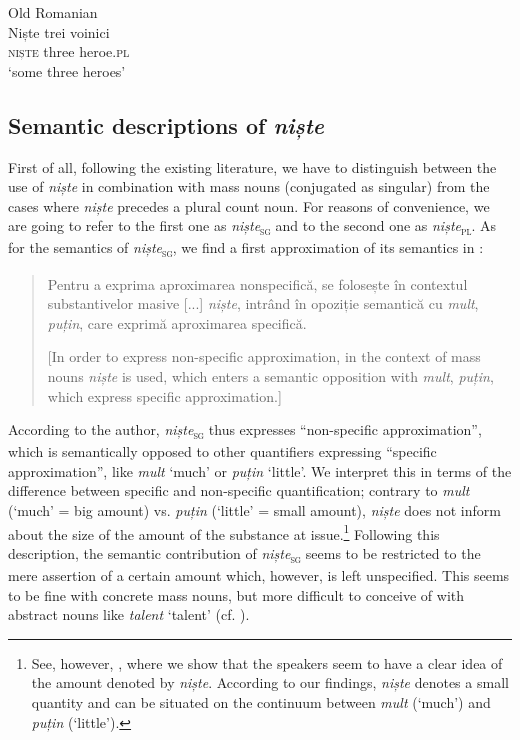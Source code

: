 \documentclass[output=paper,colorlinks,citecolor=brown]{langscibook}
\begin{document}
\ea\label{ex:ds5} Old Romanian \citep[354]{PanaDindelegan2016}\\
\gll Niște trei   voinici \\
     \textsc{niște}  three heroe.\textsc{pl}\\
\glt ‘some three heroes’ 
\z


\subsection{Semantic descriptions of \textit{niște}}\label{sec:ds2.2}

First of all, following the existing literature, we have to distinguish between the use of \textit{niște} in combination with mass nouns (conjugated as singular) from the cases where \textit{niște} precedes a plural count noun. For reasons of convenience, we are going to refer to the first one as \textit{niște}\textsc{\textsubscript{sg}} and to the second one as \textit{niște}\textsc{\textsubscript{pl}}. As for the semantics of \textit{niște}\textsc{\textsubscript{sg}}, we find a first approximation of its semantics in  \citet{Gutu2005}:

\begin{quote}
    Pentru a exprima aproximarea nonspecific\u{a}, se folosește în contextul substantivelor masive [...] \textit{niște}, intrând în opoziție semantic\u{a} cu \textit{mult}, \textit{puțin}, care exprim\u{a} aproximarea specific\u{a}.\hfill\hbox{\citep[261]{Gutu2005}}
    
    [In order to express non-specific approximation, in the context of mass nouns \textit{niște} is used, which enters a semantic opposition with \textit{mult}, \textit{puțin}, which express  specific approximation.]
\end{quote}

According to the author, \textit{niște}\textsc{\textsubscript{sg}} thus expresses “non-specific approximation”, which is semantically opposed to other quantifiers expressing “specific approximation”, like \textit{mult} ‘much’ or \textit{puțin} ‘little’. We interpret this in terms of the difference between specific and non-specific quantification; contrary to \textit{mult} (‘much’ = big amount) vs. \textit{puțin} (‘little’ = small amount), \textit{niște} does not inform about the size of the amount of the substance at issue.\footnote{See, however, \citet{DavatzStark2019}, where we show that the speakers seem to have a clear idea of the amount denoted by \textit{niște}. According to our findings, \textit{niște} denotes a small quantity and can be situated on the continuum between \textit{mult} (‘much’) and \textit{puțin} (‘little’).} Following this description, the semantic contribution of \textit{niște}\textsc{\textsubscript{sg}} seems to be restricted to the mere assertion of a certain amount which, however, is left unspecified. This seems to be fine with concrete mass nouns, but more difficult to conceive of with abstract nouns like \textit{talent} ‘talent’ (cf. \citealt[2]{Nedelcu2003}).
\end{document}
